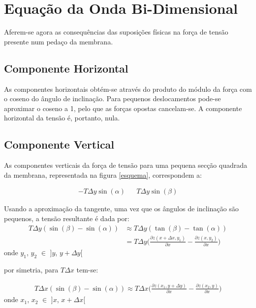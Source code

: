 \documentclass[10pt]{SelfArx} %
\begin{document}
\section*{Equação da Onda Bi-Dimensional}
Aferem-se agora as consequências das suposições físicas na força de tensão presente num pedaço da membrana.
\subsection*{Componente Horizontal}
As componentes horizontais obtém-se através do produto do módulo da força com o coseno do ângulo de inclinação. Para pequenos deslocamentos pode-se aproximar o coseno a 1, pelo que as forças opostas cancelam-se. A componente horizontal da tensão é, portanto, nula.

\subsection*{Componente Vertical}
As componentes verticais da força de tensão para uma pequena secção quadrada da membrana, representada na figura \ref{esquema}, correspondem a:

\vspace{-0.4cm}
\begin{align*}
 -T \Delta y\sin{(\alpha)} & & T \Delta y\sin{(\beta)}
\end{align*}

Usando a aproximação da tangente, uma vez que os ângulos de inclinação são pequenos, a tensão resultante é dada por:
\begin{align*}
 T\Delta y(\sin{(\beta)} - \sin{(\alpha)}) &\approx T\Delta y(\tan(\beta) - \tan(\alpha))\\
                                     &= T\Delta y\bigg( \frac{\partial z(x + \Delta x, y_1)}{\partial x} - \frac{\partial z(x, y_2)}{\partial x}\bigg)
\end{align*}
onde $y_1$, $y_2$ $\in$ ]$y$, $y+ \Delta y$[

\pagebreak

por simetria, para $T\Delta x$ tem-se:

\vspace{-0.4cm}

\begin{align*}
 T\Delta x(\sin(\beta) - \sin(\alpha)) \approx T\Delta x\bigg( \frac{\partial z(x_1, y + \Delta y)}{\partial x} - \frac{\partial z(x_2, y)}{\partial x}\bigg)
\end{align*}
onde $x_1$, $x_2$ $\in$ ]$x$, $x+ \Delta x$[ \par
\end{document}
